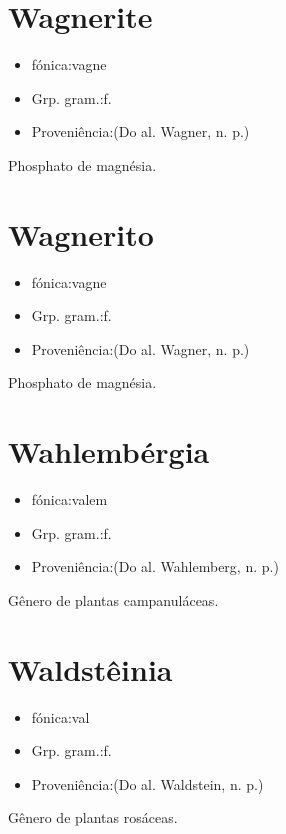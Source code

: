 \documentclass{article}
\begin{document}
\section{Wagnerite}
\begin{itemize}
\item {fónica:vagne}
\end{itemize}
\begin{itemize}
\item {Grp. gram.:f.}
\end{itemize}
\begin{itemize}
\item {Proveniência:(Do al. \textunderscore Wagner\textunderscore , n. p.)}
\end{itemize}
Phosphato de magnésia.
\section{Wagnerito}
\begin{itemize}
\item {fónica:vagne}
\end{itemize}
\begin{itemize}
\item {Grp. gram.:f.}
\end{itemize}
\begin{itemize}
\item {Proveniência:(Do al. \textunderscore Wagner\textunderscore , n. p.)}
\end{itemize}
Phosphato de magnésia.
\section{Wahlembérgia}
\begin{itemize}
\item {fónica:valem}
\end{itemize}
\begin{itemize}
\item {Grp. gram.:f.}
\end{itemize}
\begin{itemize}
\item {Proveniência:(Do al. \textunderscore Wahlemberg\textunderscore , n. p.)}
\end{itemize}
Gênero de plantas campanuláceas.
\section{Waldstêinia}
\begin{itemize}
\item {fónica:val}
\end{itemize}
\begin{itemize}
\item {Grp. gram.:f.}
\end{itemize}
\begin{itemize}
\item {Proveniência:(Do al. \textunderscore Waldstein\textunderscore , n. p.)}
\end{itemize}
Gênero de plantas rosáceas.
\end{document}
